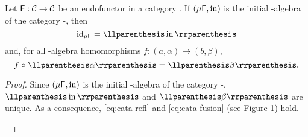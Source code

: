 \begin{lemma}

  \label{lem:cata-refl-fusion}

  Let $\mathsf{F}: \mathcal{C} \to \mathcal{C}$ be an endofunctor in a category
  . If $(\mu\mathsf{F},\operatorname{in})$ is the initial -algebra of
  the category -\alg, then
  \begin{equation}
    \label{eq:cata-refl}
    \idO{\mu\func{F}} = \cata\inmo
  \end{equation}
  and, for all -algebra homomorphisms $f: (a,\alpha) \to
  (b,\beta)$,
  \begin{equation}
    \label{eq:cata-fusion}
    f \comp \cata\alpha = \cata\beta
    \text{.}
  \end{equation}

  \begin{proof}

    Since $(\mu\mathsf{F},\operatorname{in})$ is the initial -algebra of the
    category -\alg, $\cata\inmo$ and $\cata\beta$ are unique.
    As a consequence, \eqref{eq:cata-refl} and \eqref{eq:cata-fusion}
    (see Figure \ref{fig:cata-fusion}) hold.
    \begin{figure}[htbp]
      \begin{center}
      \end{center}
      \caption{}
      \label{fig:cata-fusion}
    \end{figure}

  \end{proof}

\end{lemma}

